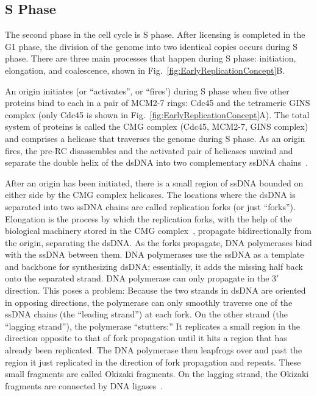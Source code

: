 		
		\subsection{S Phase}
		\label{subsec:SPhase}
		
		The second phase in the cell cycle is S phase.
		After licensing is completed in the G1 phase, the division of the genome into two identical copies occurs during S phase.
		There are three main processes that happen during S phase: initiation, elongation, and coalescence, shown in Fig.~\ref{fig:EarlyReplicationConcept}B.
		
		An origin initiates (or ``activates'', or ``fires') during S phase when five other proteins bind to each in a pair of MCM2-7 rings:
		Cdc45 and the tetrameric GINS complex (only Cdc45 is shown in Fig.~\ref{fig:EarlyReplicationConcept}A).
		The total system of proteins is called the CMG complex (Cdc45, MCM2-7, GINS complex) and comprises a helicase that traverses the genome during S phase.
		As an origin fires, the pre-RC disassembles and the activated pair of helicases unwind and separate the double helix of the dsDNA into two complementary ssDNA chains~\cite{GINSComplex}.
		
		After an origin has been initiated, there is a small region of ssDNA bounded on either side by the CMG complex helicases.
		The locations where the dsDNA is separated into two ssDNA chains are called replication forks (or just ``forks'').
		Elongation is the process by which the replication forks, with the help of the biological machinery stored in the CMG complex~\cite{PurifiedProteins}, propagate bidirectionally from the origin, separating the dsDNA.
		As the forks propagate, DNA polymerases bind with the ssDNA between them.
		DNA polymerases use the ssDNA as a template and backbone for synthesizing dsDNA; essentially, it adds the missing half back onto the separated strand.
		DNA polymerase can only propagate in the $3'$ direction.
		This poses a problem:
		Because the two strands in dsDNA are oriented in opposing directions, the polymerase can only smoothly traverse one of the ssDNA chains (the ``leading strand'') at each fork.
		On the other strand (the ``lagging strand''), the polymerase ``stutters:''
		It replicates a small region in the direction opposite to that of fork propagation until it hits a region that has already been replicated.
		The DNA polymerase then leapfrogs over and past the region it just replicated in the direction of fork propagation and repeats.
		These small fragments are called Okizaki fragments.
		On the lagging strand, the Okizaki fragments are connected by DNA ligases~\cite{MolecularCellBiology, CellMolApproach, OriginsReview}.
		
